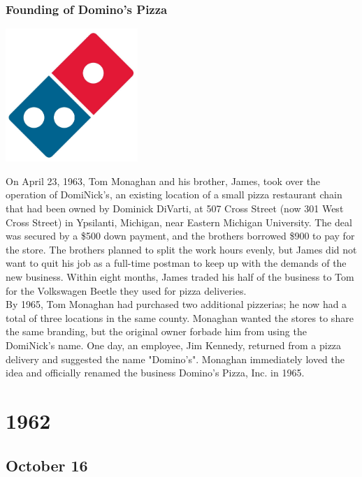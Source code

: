 \documentclass[11pt]{report}
\begin{document}
\subsection{Founding of Domino's Pizza}
\vspace{2mm}\begin{center}\includegraphics[width=5cm]{./img/dominosPizzaLogo.jpg}\end{center}
On April 23, 1963, Tom Monaghan and his brother, James, took over the operation of DomiNick's, an existing location of a small pizza restaurant chain that had been owned by Dominick DiVarti, at 507 Cross Street (now 301 West Cross Street) in Ypsilanti, Michigan, near Eastern Michigan University. The deal was secured by a \$500 down payment, and the brothers borrowed \$900 to pay for the store. The brothers planned to split the work hours evenly, but James did not want to quit his job as a full-time postman to keep up with the demands of the new business. Within eight months, James traded his half of the business to Tom for the Volkswagen Beetle they used for pizza deliveries.\\ \indent By 1965, Tom Monaghan had purchased two additional pizzerias; he now had a total of three locations in the same county. Monaghan wanted the stores to share the same branding, but the original owner forbade him from using the DomiNick's name. One day, an employee, Jim Kennedy, returned from a pizza delivery and suggested the name "Domino's". Monaghan immediately loved the idea and officially renamed the business Domino's Pizza, Inc. in 1965.

\chapter{1962}
\section{October 16}
\end{document}
